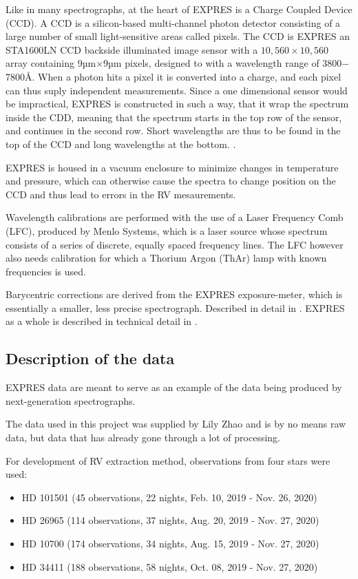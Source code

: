Like in many spectrographs, at the heart of EXPRES is a Charge Coupled Device (CCD). A CCD is a silicon-based multi-channel photon detector consisting of a large number of small light-sensitive areas called pixels. The CCD is EXPRES an STA1600LN CCD backside illuminated image sensor with a $10,560 \times 10,560$ array containing 9µm$\times$9µm pixels, designed to with a wavelength range of 3800$-$7800Å. When a photon hits a pixel it is converted into a charge, and each pixel can thus suply independent measurements. Since a one dimensional sensor would be impractical, EXPRES is constructed in such a way, that it wrap the spectrum inside the CDD, meaning that the spectrum starts in the top row of the sensor, and continues in the second row. Short wavelengths are thus to be found in the top of the CCD and long wavelengths at the bottom. \cite{CCD_general_info}. 


EXPRES is housed in a vacuum enclosure to minimize changes in temperature and pressure, which can otherwise cause the spectra to change position on the CCD and thus lead to errors in the RV mesaurements. 

Wavelength calibrations are performed with the use of a Laser Frequency Comb 
(LFC), produced by Menlo Systems, which is a laser source whose spectrum consists of a series of discrete, equally spaced frequency lines. The LFC however also needs calibration for which a Thorium Argon (ThAr) lamp with known frequencies is used.

Barycentric corrections are derived from the EXPRES exposure-meter, which is essentially a smaller, less precise spectrograph. Described in detail in \cite{barycentric_exposure_meter_blackman}. EXPRES as a whole is described in technical detail in \cite{EXPRES_technical_details_Jurgenson}.


\subsection{Description of the data}
EXPRES data are meant to serve as an example of the data being produced by next-generation spectrographs. 

The data used in this project was supplied by Lily Zhao and is by no means raw data, but data that has already gone through a lot of processing.

For development of RV extraction method, observations from four stars were used: 

\begin{itemize}
    \item HD 101501 (45 observations, 22 nights, Feb. 10, 2019 - Nov. 26, 2020)
    \item HD 26965 (114 observations, 37 nights, Aug. 20, 2019 - Nov. 27, 2020)
    \item HD 10700 (174 observations, 34 nights, Aug. 15, 2019 - Nov. 27, 2020)
    \item HD 34411 (188 observations, 58 nights, Oct. 08, 2019 - Nov. 27, 2020)
\end{itemize}

